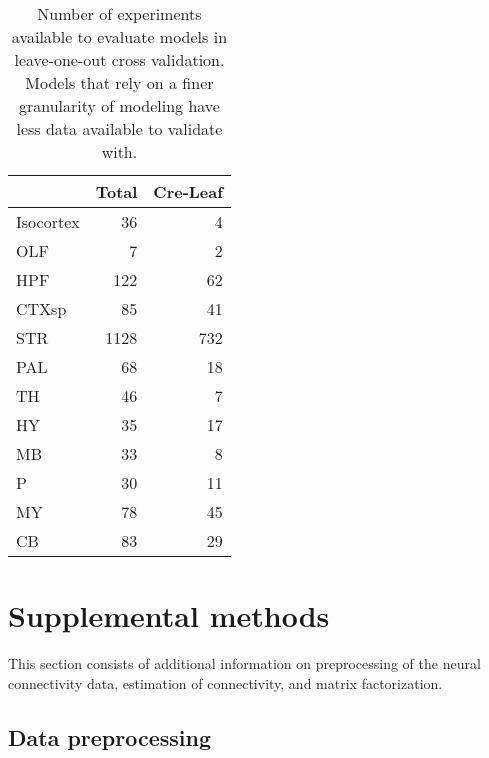 \begin{table}[H]
\small
\begin{tabular}{lrr}
\toprule
{} &  Total &  Cre-Leaf \\
\midrule
Isocortex &     36 &         4 \\
OLF       &      7 &         2 \\
HPF       &    122 &        62 \\
CTXsp     &     85 &        41 \\
STR       &   1128 &       732 \\
PAL       &     68 &        18 \\
TH        &     46 &         7 \\
HY        &     35 &        17 \\
MB        &     33 &         8 \\
P         &     30 &        11 \\
MY        &     78 &        45 \\
CB        &     83 &        29 \\
\bottomrule
\end{tabular}
\caption{Number of experiments available to evaluate models in leave-one-out cross validation. 
Models that rely on a finer granularity of modeling have less data available to validate with.}  
\end{table}

\newpage 
\section{Supplemental methods}
\label{sec:supp_methods}

This section consists of additional information on preprocessing of the neural connectivity data, estimation of connectivity, and matrix factorization.

\subsection{Data preprocessing}
\label{sec:dp}


